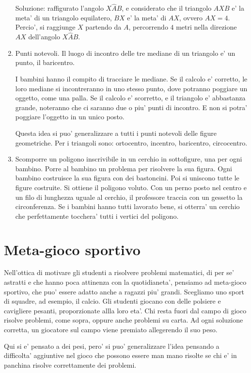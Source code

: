 \documentclass[a4paper]{article}
\begin{document}
\begin{enumerate}
        Soluzione: raffigurato l'angolo $X\hat{A}B$, e considerato che il triangolo $AXB$ e' la meta' di un triangolo equilatero, $BX$ e' la meta' di $AX$, ovvero $AX=4$. Percio', si raggiunge $X$ partendo da $A$, percorrendo $4$ metri nella direzione $AX$ dell'angolo $X\hat{A}B$.


    \item Punti notevoli. Il luogo di incontro delle tre mediane di un triangolo e' un punto, il baricentro.

        I bambini hanno il compito di tracciare le mediane. Se il calcolo e' corretto, le loro mediane si incontreranno in uno stesso punto, dove potranno poggiare un oggetto, come una palla. Se il calcolo e' scorretto, e il triangolo e' abbastanza grande, noteranno che ci saranno due o piu' punti di incontro. E non si potra' poggiare l'oggetto in un unico posto.

        Questa idea si puo' generalizzare a tutti i punti notevoli delle figure geometriche. Per i triangoli sono: ortocentro, incentro, baricentro, circocentro.

    \item Scomporre un poligono inscrivibile in un cerchio in sottofigure, una per ogni bambino. Porre al bambino un problema per risolvere la sua figura. Ogni bambino costruisce la sua figura con dei bastoncini. Poi si uniscono tutte le figure costruite. Si ottiene il poligono voluto. Con un perno posto nel centro e un filo di lunghezza uguale al cerchio, il professore traccia con un gessetto la circonferenza. Se i bambini hanno tutti lavorato bene, si otterra' un cerchio che perfettamente tocchera' tutti i vertici del poligono.

\end{enumerate}

\section{Meta-gioco sportivo}
Nell'ottica di motivare gli studenti a risolvere problemi matematici, di per se' astratti e che hanno poca attinenza con la quotidianeta', pensiamo ad meta-gioco sportivo, che puo' essere adatto anche a ragazzi piu' grandi. Scegliamo uno sport di squadre, ad esempio, il calcio. Gli studenti giocano con delle polsiere e cavigliere pesanti, proporzionate allla loro eta'. Chi resta fuori dal campo di gioco risolve problemi, come sopra, oppure anche problemi su carta. Ad ogni soluzione corretta, un giocatore sul campo viene premiato allegerendo il suo peso. 

Qui si e' pensato a dei pesi, pero' si puo' generalizzare l'idea pensando a difficolta' aggiuntive nel gioco che possono essere man mano risolte se chi e' in panchina risolve correttamente dei problemi.


\printindex
\end{document}
